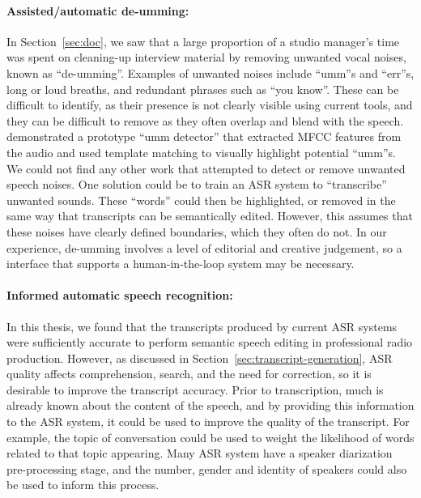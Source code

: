 \paragraph{Assisted/automatic de-umming:}

In Section~\ref{sec:doc}, we saw that a large proportion of a studio manager's time was spent on cleaning-up interview
material by removing unwanted vocal noises, known as ``de-umming''. Examples of unwanted noises include ``umm''s and
``err''s, long or loud breaths, and redundant phrases such as ``you know''.  These can be difficult to identify, as
their presence is not clearly visible using current tools, and they can be difficult to remove as they often overlap
and blend with the speech. \citet{Loviscach2013} demonstrated a prototype ``umm detector'' that extracted MFCC
\citep{Imai1983} features from the audio and used template matching to visually highlight potential ``umm''s. We could
not find any other work that attempted to detect or remove unwanted speech noises.  One solution could be to train an
ASR system to ``transcribe'' unwanted sounds. These ``words'' could then be highlighted, or removed in the same way
that transcripts can be semantically edited.  However, this assumes that these noises have clearly defined boundaries,
which they often do not.  In our experience, de-umming involves a level of editorial and creative judgement, so a
interface that supports a human-in-the-loop system may be necessary.

\paragraph{Informed automatic speech recognition:}

In this thesis, we found that the transcripts produced by current ASR systems were sufficiently accurate to perform
semantic speech editing in professional radio production. However, as discussed in
Section~\ref{sec:transcript-generation}, ASR quality affects comprehension, search, and the need for correction, so it
is desirable to improve the transcript accuracy. Prior to transcription, much is already known about the content of the
speech, and by providing this information to the ASR system, it could be used to improve the quality of the transcript.
For example, the topic of conversation could be used to weight the likelihood of words related to that topic appearing.
Many ASR system have a speaker diarization pre-processing stage, and the number, gender and identity of speakers could
also be used to inform this process.

